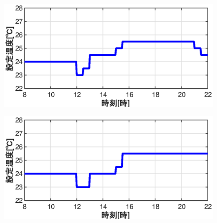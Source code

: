 \begin{figure}[htbp]
\begin{center}
\begin{minipage}{0.4\textwidth}
\begin{center}
      \end{center}
    \end{minipage}
    \begin{minipage}{0.4\textwidth}
      \begin{center}
        \includegraphics[width=1.0\textwidth,keepaspectratio=true]{fig/math_result_schedule_settemp_f.eps}\\
      \end{center}
    \end{minipage}
    \begin{minipage}{0.4\textwidth}
      \begin{center}
        \includegraphics[width=1.0\textwidth,keepaspectratio=true]{fig/math_result_schedule_settemp_g.eps}\\
      \end{center}
    \end{minipage}
    \begin{minipage}{0.4\textwidth}
      \begin{center}

\end{center}
\end{minipage}
\end{center}
\end{figure}

